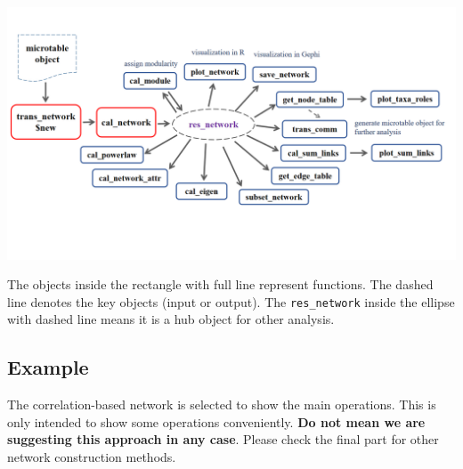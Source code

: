 \documentclass[
]{book}
\newenvironment{Shaded}{\begin{snugshade}}{\end{snugshade}}
\newcommand{\AttributeTok}[1]{\textcolor[rgb]{0.77,0.63,0.00}{#1}}
\newcommand{\CommentTok}[1]{\textcolor[rgb]{0.56,0.35,0.01}{\textit{#1}}}
\newcommand{\FloatTok}[1]{\textcolor[rgb]{0.00,0.00,0.81}{#1}}
\newcommand{\FunctionTok}[1]{\textcolor[rgb]{0.00,0.00,0.00}{#1}}
\newcommand{\NormalTok}[1]{#1}
\newcommand{\OtherTok}[1]{\textcolor[rgb]{0.56,0.35,0.01}{#1}}
\newcommand{\SpecialCharTok}[1]{\textcolor[rgb]{0.00,0.00,0.00}{#1}}
\newcommand{\StringTok}[1]{\textcolor[rgb]{0.31,0.60,0.02}{#1}}
\begin{document}
\begin{center}\includegraphics[width=8000px]{Images/network_framework} \end{center}

The objects inside the rectangle with full line represent functions.
The dashed line denotes the key objects (input or output). The \texttt{res\_network} inside the ellipse with dashed line means it is a hub object for other analysis.

\hypertarget{example-5}{%
\subsection{Example}\label{example-5}}

The correlation-based network is selected to show the main operations.
This is only intended to show some operations conveniently.
\textbf{Do not mean we are suggesting this approach in any case}.
Please check the final part for other network construction methods.

\begin{Shaded}
\end{Shaded}
\end{document}

